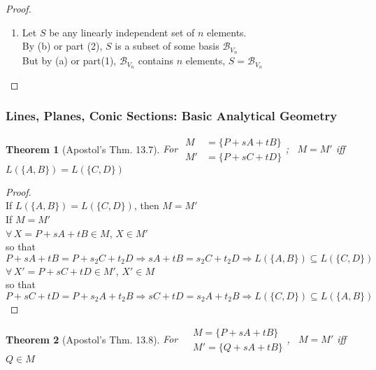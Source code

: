 \documentclass[twoside]{amsart}
\theoremstyle{plain}
\newtheorem{theorem}{Theorem}
\theoremstyle{definition}
\begin{document}
\begin{proof}
\begin{enumerate}
$|S'| = q+1$.   \\
If $L(S') = V_n$, done.   \\
\phantom{ If } Otherwise, repeat until $S^{(n-q)}$ is obtained; otherwise, $S^{(n+1-q)}$ contains $n+1$ elements, contradicting Thm.12.8 ($\forall$ set of $n+1$ elements in $L(S)$ is dependent, if $|S| = n$ and $S$ linearly independent). \\ 
\item Let $S$ be any linearly independent set of $n$ elements.  \\
  \phantom{ Let } By (b) or part (2), $S$ is a subset of some basis $\mathcal{B}_{V_n}$ \\
  \phantom{ Let } But by (a) or part(1), $\mathcal{B}_{V_n}$ contains $n$ elements, $S = \mathcal{B}_{V_n}$
\end{enumerate}
\end{proof}

\subsubsection{ Lines, Planes, Conic Sections: Basic Analytical Geometry }

\begin{theorem}[Apostol's Thm. 13.7]
  For $\begin{aligned}
    M & = \{ P + sA + tB \} \\
    M' & = \{ P+ sC + tD \}
\end{aligned}$; \quad \, $M = M'$ iff $L(\{ A,B \} ) = L(\{ C, D \})$  
\end{theorem}

\begin{proof} \quad \\
  \noindent If $L(\{ A,B \} ) = L(\{ C,D \})$, then $M=M'$  \\
  If $M=M'$ \\
  \quad $\forall \, X = P + sA + tB \in M$, $X \in M'$ \\
  \quad \quad so that $P + sA + tB = P + s_2 C + t_2 D \Longrightarrow sA + tB = s_2 C + t_2 D \Longrightarrow L(\{ A,B \}) \subseteq L(\{ C,D \})$ \medskip \\
  \quad $\forall \, X' = P + sC + tD \in M'$, $X' \in M$ \\
  \quad \quad so that $P + sC + tD = P +s_2 A +t_2 B \Longrightarrow sC + tD = s_2 A + t_2 B \Longrightarrow L(\{ C,D \}) \subseteq L(\{ A,B \})$ 
\end{proof}

\begin{theorem}[Apostol's Thm. 13.8]
  For $\begin{aligned}
    & M = \{ P + sA + tB \} \\
    & M' = \{ Q + sA + tB \}
\end{aligned}$, \quad \, $M= M'$ iff $Q \in M$ 
\end{theorem}
\end{document}

